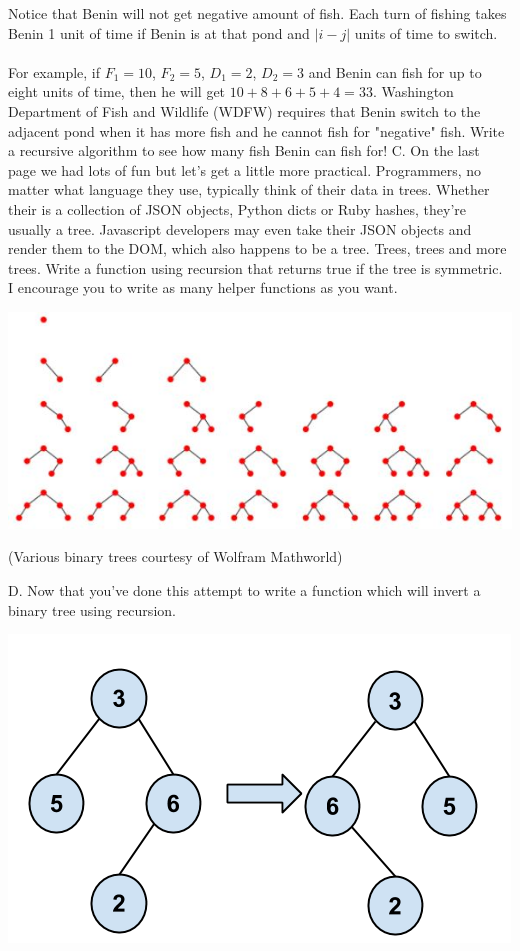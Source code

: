 \documentclass[12pt]{article}
\begin{document}
Notice that Benin will not get negative amount of fish.
Each turn of fishing takes Benin 1 unit of time if Benin is at that pond and $|i - j|$ units of time to switch.
\\\\
For example, if $F_1 = 10$, $F_2 = 5$, $D_1 = 2$, $D_2 = 3$ and Benin can fish for up to eight units of time, then he will get $10 + 8 + 6 + 5 + 4 = 33$.
Washington Department of Fish and Wildlife (WDFW) requires that Benin switch to the adjacent pond when it has more fish and he cannot fish for "negative" fish.
Write a recursive algorithm to see how many fish Benin can fish for!
\newpage
\noindent C. On the last page we had lots of fun but let's get a little more practical. Programmers, no matter what language they use, typically think of their data in trees. Whether their is a collection of JSON objects, Python dicts or Ruby hashes, they're usually a tree. Javascript developers may even take their JSON objects and render them to the DOM, which also happens to be a tree. Trees, trees and more trees. Write a function using recursion that returns true if the tree is symmetric. I encourage you to write as many helper functions as you want.\\
\centerline{\includegraphics[scale = 0.5]{binarytree.jpg}}
\centerline{(Various binary trees courtesy of Wolfram Mathworld)}
\newpage
\noindent D. Now that you've done this attempt to write a function which will invert a binary tree using recursion.\\
\centerline{\includegraphics[scale = 0.4]{invertbtree.png}}
\end{document}
